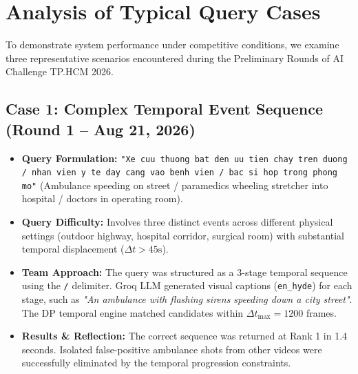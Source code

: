 \documentclass[10pt,a4paper,twocolumn]{article}
\begin{document}
\section{Analysis of Typical Query Cases}

To demonstrate system performance under competitive conditions, we examine three representative scenarios encountered during the Preliminary Rounds of AI Challenge TP.HCM 2026.

\subsection{Case 1: Complex Temporal Event Sequence (Round 1 -- Aug 21, 2026)}
\begin{itemize}
    \item \textbf{Query Formulation:} \texttt{"Xe cuu thuong bat den uu tien chay tren duong / nhan vien y te day cang vao benh vien / bac si hop trong phong mo"} (Ambulance speeding on street / paramedics wheeling stretcher into hospital / doctors in operating room).
    \item \textbf{Query Difficulty:} Involves three distinct events across different physical settings (outdoor highway, hospital corridor, surgical room) with substantial temporal displacement ($\Delta t > 45\text{s}$).
    \item \textbf{Team Approach:} The query was structured as a 3-stage temporal sequence using the \texttt{/} delimiter. Groq LLM generated visual captions (\texttt{en\_hyde}) for each stage, such as \textit{"An ambulance with flashing sirens speeding down a city street"}. The DP temporal engine matched candidates within $\Delta t_{\text{max}} = 1200$ frames.
    \item \textbf{Results \& Reflection:} The correct sequence was returned at Rank 1 in 1.4 seconds. Isolated false-positive ambulance shots from other videos were successfully eliminated by the temporal progression constraints.
\end{itemize}
\end{document}
